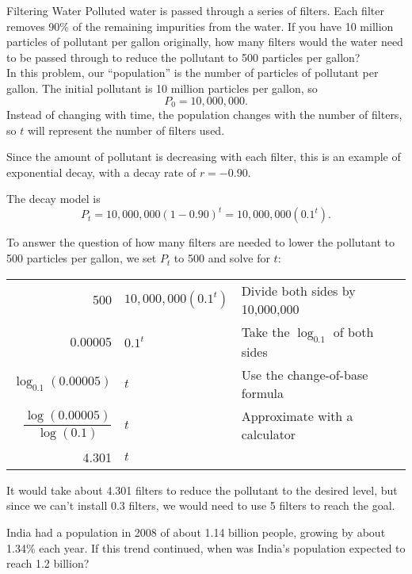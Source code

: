 \begin{example}[https://www.youtube.com/watch?v=ei5RaBwgRNc]{Filtering Water}
Polluted water is passed through a series of filters.  Each filter removes 90\% of the remaining impurities from the water.  If you have 10 million particles of pollutant per gallon originally, how many filters would the water need to be passed through to reduce the pollutant to 500 particles per gallon?\\

In this problem, our ``population'' is the number of particles of pollutant per gallon.  The initial pollutant is 10 million particles per gallon, so \[P_0 = 10,000,000.\]  Instead of changing with time, the population changes with the number of filters, so $t$ will represent the number of filters used.

Since the amount of pollutant is decreasing with each filter, this is an example of exponential decay, with a decay rate of $r=-0.90$.

The decay model is
\[P_t = 10,000,000(1-0.90)^t = 10,000,000(0.1^t).\]

To answer the question of how many filters are needed to lower the pollutant to 500 particles per gallon, we set $P_t$ to 500 and solve for $t$:
\begin{center}
\begin{tabular}{r @{ $=$} l l}
500 & $10,000,000(0.1^t)$ & Divide both sides by 10,000,000\\
0.00005 & $0.1^t$ & Take the $\log_{0.1}$ of both sides\\
$\log_{0.1}(0.00005)$ & $t$ & Use the change-of-base formula\\
$\dfrac{\log(0.00005)}{\log(0.1)}$ & $t$ & Approximate with a calculator\\
4.301 & $t$
\end{tabular}
\end{center}
It would take about 4.301 filters to reduce the pollutant to the desired level, but since we can't install 0.3 filters, we would need to use 5 filters to reach the goal.
\end{example}

\begin{try}
India had a population in 2008 of about 1.14 billion people, growing by about 1.34\% each year.  If this trend continued, when was India's population expected to reach 1.2 billion?
\end{try}
\vfill
\pagebreak

